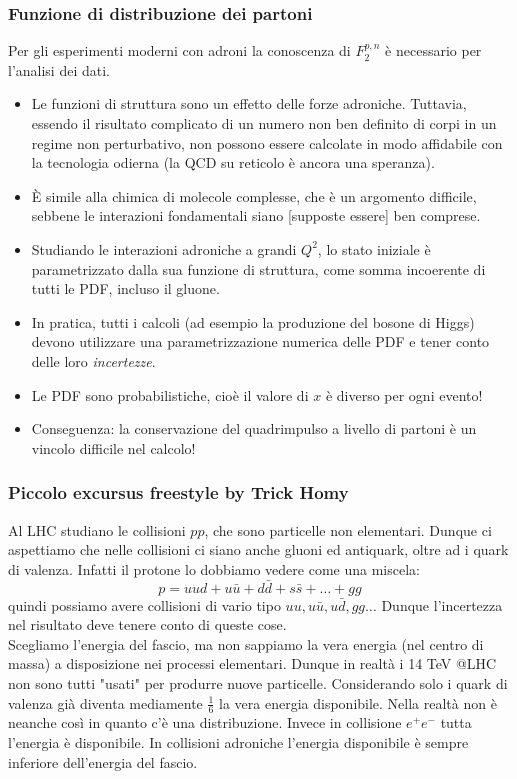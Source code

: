 \subsubsection{Funzione di distribuzione dei partoni}
Per gli esperimenti moderni con adroni la conoscenza di $F_2^{p,n}$ è necessario per l'analisi dei dati.
\begin{itemize}
    \item Le funzioni di struttura sono un effetto delle forze adroniche. Tuttavia, essendo il risultato complicato di un numero non ben definito di corpi in un regime non perturbativo, non possono essere calcolate in modo affidabile con la tecnologia odierna (la QCD su reticolo è ancora una speranza).
    \item È simile alla chimica di molecole complesse, che è un argomento difficile, sebbene le interazioni fondamentali siano [supposte essere] ben comprese.
    \item Studiando le interazioni adroniche a grandi $Q^2$, lo stato iniziale è parametrizzato dalla sua funzione di struttura, come somma incoerente di tutti le PDF, incluso il gluone.
    \item In pratica, tutti i calcoli (ad esempio la produzione del bosone di Higgs) devono utilizzare una parametrizzazione numerica delle PDF e tener conto delle loro \textit{incertezze}.
    \item Le PDF sono probabilistiche, cioè il valore di $x$ è diverso per ogni evento!
    \item Conseguenza: la conservazione del quadrimpulso a livello di partoni è un vincolo difficile nel calcolo!
\end{itemize}
\subsubsection{Piccolo excursus freestyle by Trick Homy}
Al LHC studiano le collisioni $pp$, che sono particelle non elementari. Dunque ci aspettiamo che nelle collisioni ci siano anche gluoni ed antiquark, oltre ad i quark di valenza. Infatti il protone lo dobbiamo vedere come una miscela:
$$
p=uud+u\bar u+d\bar d+s\bar s+\dots+gg
$$
quindi possiamo avere collisioni di vario tipo $uu,u\bar u,u\bar d, gg\dots$ Dunque l'incertezza nel risultato deve tenere conto di queste cose.\\
Scegliamo l'energia del fascio, ma non sappiamo la vera energia (nel centro di massa) a disposizione nei processi elementari. Dunque in realtà i 14 TeV @LHC non sono tutti "usati" per produrre nuove particelle. Considerando solo i quark di valenza già diventa mediamente $\frac{1}{6}$ la vera energia disponibile. Nella realtà non è neanche così in quanto c'è una distribuzione. Invece in collisione $e^+e^-$ tutta l'energia è disponibile. In collisioni adroniche l'energia disponibile è sempre inferiore dell'energia del fascio.

